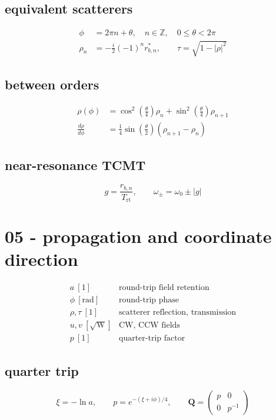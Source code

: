 \subsection*{equivalent scatterers}
\[
\displaystyle \begin{aligned}\phi&=2\pi n+\theta,\quad n\in\mathbb Z,\quad0\le\theta<2\pi\\\rho_n&=-\frac{i}{2}(-1)^n r_{b,n}^*,\qquad\tau=\sqrt{1-|\rho|^2}\end{aligned}
\]

\subsection*{between orders}
\[
\displaystyle \begin{aligned}\rho(\phi)&=\cos^2\!\left(\frac\theta4\right)\rho_n+\sin^2\!\left(\frac\theta4\right)\rho_{n+1}\\\frac{d\rho}{d\phi}&=\frac14\sin\!\left(\frac\theta2\right)(\rho_{n+1}-\rho_n)\end{aligned}
\]

\subsection*{near-resonance TCMT}
\[
\displaystyle g=\frac{r_{b,n}}{T_{\mathrm{rt}}},\qquad\omega_\pm=\omega_0\pm|g|
\]

\clearpage
\section*{05 - propagation and coordinate direction}

\[
\begin{array}{ll}a\ [1]&\text{round-trip field retention}\\[0.6em]\phi\ [\mathrm{rad}]&\text{round-trip phase}\\[0.6em]\rho,\tau\ [1]&\text{scatterer reflection, transmission}\\[0.6em]u,v\ [\sqrt{\mathrm W}]&\text{CW, CCW fields}\\[0.6em]p\ [1]&\text{quarter-trip factor}\end{array}
\]

\subsection*{quarter trip}
\[
\displaystyle \xi=-\ln a,\qquad p=e^{-(\xi+i\phi)/4},\qquad\mathbf Q=\begin{pmatrix}p&0\\0&p^{-1}\end{pmatrix}
\]

